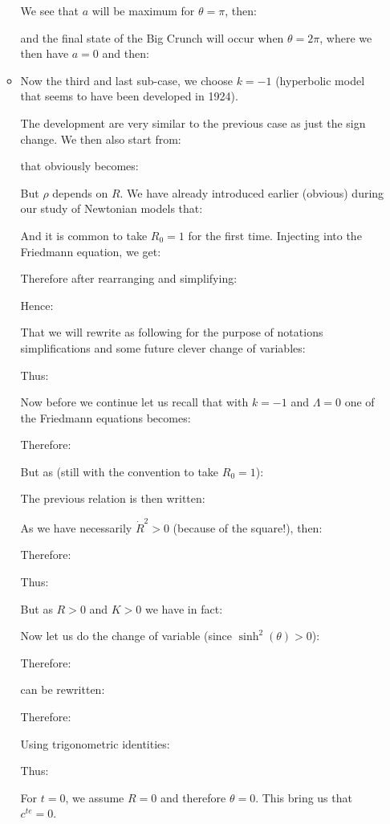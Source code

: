 \begin{itemize}
\begin{itemize}
				We see that $a$ will be maximum for $\theta=\pi$, then:
				
				and the final state of the Big Crunch will occur when $\theta=2\pi$, where we then have $a=0$ and then:
				
							
				\item Now the third and last sub-case, we choose $k=-1$ (hyperbolic model that seems to have been developed in 1924).
				
				The development are very similar to the previous case as just the sign change. We then also start from:
				
				that obviously becomes:
				
				But $\rho$ depends on $R$. We have already introduced earlier (obvious) during our study of Newtonian models that:
				
				And it is common to take $R_0=1$ for the first time. Injecting into the Friedmann equation, we get:
				
				Therefore after rearranging and simplifying:
				
				Hence:
				
				That we will rewrite as following for the purpose of notations simplifications and some future clever change of variables:
				
				Thus:
				
				Now before we continue let us recall that with $k=-1$ and $\Lambda=0$ one of the Friedmann equations becomes:
				
				Therefore:
				
				But as (still with the convention to take $R_0=1$):
				
				The previous relation is then written:
				
				As we have necessarily $\dot{R}^2>0$ (because of the square!), then:
				
				Therefore:
				
				Thus:
				
				But as $R>0$ and $K>0$ we have in fact:
				
				Now let us do the change of variable (since $\sinh^2(\theta)>0$):
				
				Therefore:
				
				can be rewritten:
				
				Therefore:
				
				Using trigonometric identities:
				
				Thus:
				
				For $t=0$, we assume $R=0$ and therefore $\theta=0$. This bring us that $c^{te}=0$.
				

\end{itemize}
\end{itemize}
